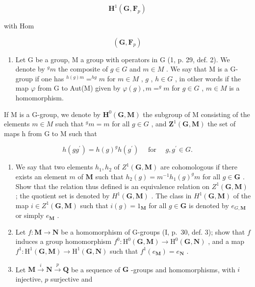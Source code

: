 \[
\mathbf {H} ^ {1} (\mathbf {G}, \mathbf {F} _ {p})
\]

with Hom

\[
(\mathbf {G}, \mathbf {F} _ {p})
\]

\begin{enumerate}
\def\labelenumi{\arabic{enumi})}
\setcounter{enumi}{22}
\tightlist
\item
  Let G be a group, M a group with operators in G (1, p. 29, def. 2). We denote by \(^{g}m\) the composite of \(g \in G\) and \(m \in M\) . We say that M is a G-group if one has \(^{h(g)m} = ^{hg}m\) for \(m \in M\) , \(g\) , \(h \in G\) , in other words if the map \(\varphi\) from G to Aut(M) given by \(\varphi(g), m = ^{g}m\) for \(g \in G\) , \(m \in M\) is a homomorphism.
\end{enumerate}

If M is a G-group, we denote by \(\mathbf{H}^{0}(\mathbf{G},\mathbf{M})\) the subgroup of M consisting of the elements \(m\in M\) such that \(^{g}m=m\) for all \(g\in G\) , and \(\mathbf{Z}^{1}(\mathbf{G},\mathbf{M})\) the set of maps h from G to M such that

\[
h (g g ^ {\prime}) = h (g) ^ {g} h (g ^ {\prime}) \quad \text { for } \quad g, g ^ {\prime} \in G.
\]

\begin{enumerate}
\def\labelenumi{\alph{enumi})}
\item
  We say that two elements \(h_1, h_2\) of \(Z^1(\mathbf{G}, \mathbf{M})\) are cohomologous if there exists an element \(m\) of \(\mathbf{M}\) such that \(h_2(g) = m^{-1} h_1(g)^g m\) for all \(g \in \mathbf{G}\) . Show that the relation thus defined is an equivalence relation on \(Z^1(\mathbf{G}, \mathbf{M})\) ; the quotient set is denoted by \(H^1(\mathbf{G}, \mathbf{M})\) . The class in \(H^1(\mathbf{G}, \mathbf{M})\) of the map \(i \in Z^1(\mathbf{G}, \mathbf{M})\) such that \(i(g) = 1_{\mathbf{M}}\) for all \(g \in \mathbf{G}\) is denoted by \(e_{G,\mathbf{M}}\) or simply \(e_{\mathbf{M}}\) .
\item
  Let \(f: \mathbf{M} \to \mathbf{N}\) be a homomorphism of G-groups (I, p.~30, def. 3); show that \(f\) induces a group homomorphism \(f^{0}: \mathrm{H}^{0}(\mathbf{G}, \mathbf{M}) \to \mathrm{H}^{0}(\mathbf{G}, \mathbf{N})\) , and a map \(f^{1}: \mathrm{H}^{1}(\mathbf{G}, \mathbf{M}) \to \mathrm{H}^{1}(\mathbf{G}, \mathbf{N})\) such that \(f^{1}(e_{\mathbf{M}}) = e_{\mathbf{N}}\) .
\item
  Let \(\mathbf{M} \xrightarrow{i} \mathbf{N} \xrightarrow{p} \mathbf{Q}\) be a sequence of \(\mathbf{G}\) -groups and homomorphisms, with \(i\) injective, \(p\) surjective and
\end{enumerate}

